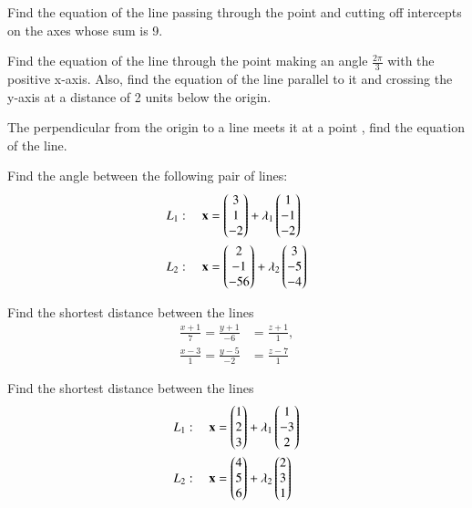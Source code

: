 \item Find the equation of the line passing through the point  and cutting off intercepts on the axes whose sum is 9.
\item Find the equation of the line through the point  making an angle $\frac{2\pi}{3}$ with the positive x-axis.  Also, find the equation of the line parallel to it and crossing the y-axis at a distance of 2 units below the origin.
\item The perpendicular from the origin to a line meets it at a point , find the equation of the line.
\item Find the angle between the following pair of lines:
\begin{align}
    L_1: \quad \mathbf{x} &= \begin{pmatrix}3\\1\\-2\end{pmatrix} + \lambda_1\begin{pmatrix}1 \\ -1 \\-2\end{pmatrix} \label{aug/22/eq:1} \\
    L_2: \quad \mathbf{x} &= \begin{pmatrix}2\\-1\\-56\end{pmatrix} + \lambda_2\begin{pmatrix}3 \\ -5 \\-4\end{pmatrix} \label{aug/22/eq:2}
    \end{align}
\solution

%
\item Find the shortest distance between the lines 
\begin{align}
\frac{x+1}{7} = \frac{y+1}{-6} &= \frac{z+1}{1}, 
\\
\frac{x-3}{1} = \frac{y-5}{-2} &= \frac{z-7}{1} 
\end{align}
%
\item Find the shortest distance between the lines 
\begin{align}
L_1: \quad \mathbf{x} &= \begin{pmatrix}1\\2\\3\end{pmatrix} + \lambda_1\begin{pmatrix}1 \\ -3 \\2\end{pmatrix}
\\
L_2: \quad \mathbf{x} &= \begin{pmatrix}4\\5\\6\end{pmatrix} + \lambda_2\begin{pmatrix}2 \\ 3 \\1\end{pmatrix}
\end{align}
